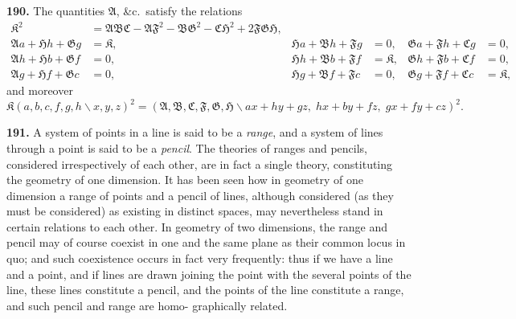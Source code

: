 \documentclass[11pt,a4paper]{book}
\begin{document}
\begin{center}
\textbf{190.} The quantities $\mathfrak{A}$, \&c.\ satisfy the relations
\begin{align*}
\mathfrak{K}^2 &= \mathfrak{A}\mathfrak{B}\mathfrak{C} - \mathfrak{A}\mathfrak{F}^2 - \mathfrak{B}\mathfrak{G}^2 - \mathfrak{C}\mathfrak{H}^2 + 2\mathfrak{F}\mathfrak{G}\mathfrak{H},\\
\mathfrak{A}a+\mathfrak{H}h+\mathfrak{G}g &= \mathfrak{K}, & \mathfrak{H}a+\mathfrak{B}h+\mathfrak{F}g &= 0, & \mathfrak{G}a+\mathfrak{F}h+\mathfrak{C}g &= 0,\\
\mathfrak{A}h+\mathfrak{H}b+\mathfrak{G}f &= 0, & \mathfrak{H}h+\mathfrak{B}b+\mathfrak{F}f &= \mathfrak{K}, & \mathfrak{G}h+\mathfrak{F}b+\mathfrak{C}f &= 0,\\
\mathfrak{A}g+\mathfrak{H}f+\mathfrak{G}c &= 0, & \mathfrak{H}g+\mathfrak{B}f+\mathfrak{F}c &= 0, & \mathfrak{G}g+\mathfrak{F}f+\mathfrak{C}c &= \mathfrak{K},
\end{align*}
and moreover
\[
\mathfrak{K}(a,b,c,f,g,h\!\backslash x,y,z)^2 = (\mathfrak{A},\mathfrak{B},\mathfrak{C},\mathfrak{F},\mathfrak{G},\mathfrak{H}\!\backslash ax+hy+gz,\; hx+by+fz,\; gx+fy+cz)^2.
\]

\newpage
\textbf{191.} A system of points in a line is said to be a \textit{range}, and a system of
lines through a point is said to be a \textit{pencil}. The theories of ranges and pencils,
considered irrespectively of each other, are in fact a single theory, constituting the
geometry of one dimension. It has been seen how in geometry of one dimension a
range of points and a pencil of lines, although considered (as they must be considered)
as existing in distinct spaces, may nevertheless stand in certain relations to each other.
In geometry of two dimensions, the range and pencil may of course coexist in one
and the same plane as their common locus in quo; and such coexistence occurs in
fact very frequently: thus if we have a line and a point, and if lines are drawn
joining the point with the several points of the line, these lines constitute a pencil,
and the points of the line constitute a range, and such pencil and range are homo-
graphically related.


\end{center}
\end{document}

